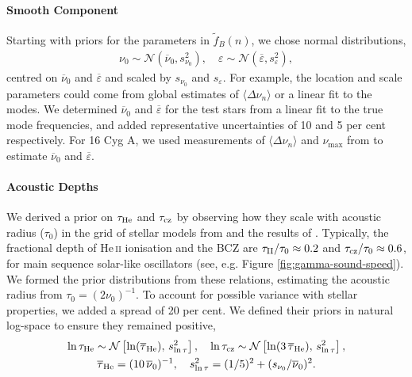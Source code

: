 \paragraph{Smooth Component} Starting with priors for the parameters in \(\tilde{f}_B(n)\), we chose normal distributions,
%
\begin{gather}
    \nu_0 \sim \mathcal{N}(\overline{\nu}_0, s_{\nu_0}^2), \quad \varepsilon \sim \mathcal{N}(\overline{\varepsilon}, s_\varepsilon^2),%
\end{gather}
%
centred on \(\overline{\nu}_0\) and \(\overline{\varepsilon}\) and scaled by \(s_{\nu_0}\) and \(s_\varepsilon\). For example, the location and scale parameters could come from global estimates of \(\langle\Delta\nu_n\rangle\) or a linear fit to the modes. We determined \(\overline{\nu}_0\) and \(\overline{\varepsilon}\) for the test stars from a linear fit to the true mode frequencies, and added representative uncertainties of 10 and 5 per cent respectively. For 16 Cyg A, we used measurements of \(\langle\Delta\nu_n\rangle\) and \(\nu_{\max}\) from \citet{Lund.SilvaAguirre.ea2017} to estimate \(\overline{\nu}_0\) and \(\overline{\varepsilon}\).


\paragraph{Acoustic Depths} We derived a prior on \(\tau_{{\mathrm{He}}}\) and \(\tau_{{\mathrm{cz}}}\) by observing how they scale with acoustic radius (\(\tau_0\)) in the grid of stellar models from \citet{Lyttle.Davies.ea2021} and the results of \citet{Verma.Rorsted.ea2022}. Typically, the fractional depth of He\,\textsc{ii} ionisation and the BCZ are \(\tau_{{\mathrm{II}}}/\tau_0 \approx 0.2\) and \(\tau_{{\mathrm{cz}}}/\tau_0 \approx 0.6\), for main sequence solar-like oscillators (see, e.g. Figure \ref{fig:gamma-sound-speed}). We formed the prior distributions from these relations, estimating the acoustic radius from \({\tau}_0 = (2\nu_0)^{-1}\). To account for possible variance with stellar properties, we added a spread of 20 per cent. We defined their priors in natural log-space to ensure they remained positive,
%
\begin{gather}
    \ln\tau_{{\mathrm{He}}} \sim \mathcal{N}\left[ \ln(\overline{\tau}_{{\mathrm{He}}}), \, s_{\ln\tau}^2 \right], \quad \ln\tau_{{\mathrm{cz}}} \sim \mathcal{N}\left[\ln(3\,\overline{\tau}_{{\mathrm{He}}}), \, s_{\ln\tau}^2 \right],\\
    \overline{\tau}_{{\mathrm{He}}} = (10\,\overline{\nu}_0)^{-1}, \quad s_{\ln\tau}^2 = (1/5)^2 + (s_{\nu_0}/\overline{\nu}_0)^2.
\end{gather}

